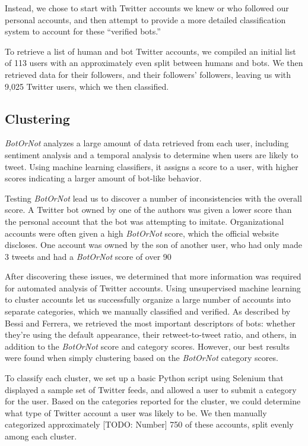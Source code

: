 \documentclass{sig-alternate-05-2015}
\begin{document}
Instead, we chose to start with Twitter accounts we knew or who followed our personal accounts, and then attempt to provide a more detailed classification system to account for these "`verified bots."'

To retrieve a list of human and bot Twitter accounts, we compiled an initial list of 113 users with an approximately even split between humans and bots. We then retrieved data for their followers, and their followers' followers, leaving us with 9,025 Twitter users, which we then classified.

\subsection{Clustering}

\emph{BotOrNot} analyzes a large amount of data retrieved from each user, including sentiment analysis and a temporal analysis to determine when users are likely to tweet. Using machine learning classifiers, it assigns a score to a user, with higher scores indicating a larger amount of bot-like behavior.

Testing \emph{BotOrNot} lead us to discover a number of inconsistencies with the overall score. A Twitter bot owned by one of the authors was given a lower score than the personal account that the bot was attempting to imitate. Organizational accounts were often given a high \emph{BotOrNot} score, which the official website discloses. One account was owned by the son of another user, who had only made 3 tweets and had a \emph{BotOrNot} score of over 90%

After discovering these issues, we determined that more information was required for automated analysis of Twitter accounts. Using unsupervised machine learning to cluster accounts let us successfully organize a large number of accounts into separate categories, which we manually classified and verified. As described by Bessi and Ferrera\cite{Bessi:PresElect}, we retrieved the most important descriptors of bots: whether they're using the default appearance, their retweet-to-tweet ratio, and others, in addition to the \emph{BotOrNot} score and category scores. However, our best results were found when simply clustering based on the \emph{BotOrNot} category scores.

To classify each cluster, we set up a basic Python script using Selenium that displayed a sample set of Twitter feeds, and allowed a user to submit a category for the user. Based on the categories reported for the cluster, we could determine what type of Twitter account a user was likely to be. We then manually categorized approximately [TODO: Number] 750 of these accounts, split evenly among each cluster.
\end{document}
